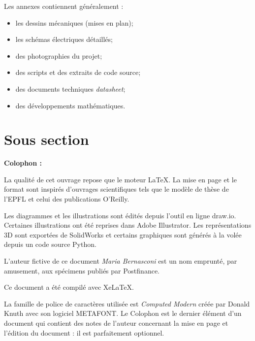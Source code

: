 \documentclass[
    iai, %
    eai, %
]{heig-tb}
\begin{document}
Les annexes contiennent généralement :

\begin{itemize}
  \item les dessins mécaniques (mises en plan);
  \item les schémas électriques détaillés;
  \item des photographies du projet;
  \item des scripts et des extraits de code source;
  \item des documents techniques \pex \emph{datasheet};
  \item des développements mathématiques.
\end{itemize}
\section{Sous section}
\lipsum[1]

\let\cleardoublepage\clearpage
\backmatter

\label{glossaire}
\printnoidxglossary
\printbibliography
\label{index}
\printindex

\clearpage
\Large\textbf{Colophon :}\par\normalsize
\thispagestyle{empty}
La qualité de cet ouvrage repose que le moteur \LaTeX. La mise en page et le format sont inspirés d'ouvrages scientifiques tels que le modèle de thèse de l'EPFL et celui des publications O'Reilly.

Les diagrammes et les illustrations sont édités depuis l'outil en ligne draw.io. Certaines illustrations ont été reprises dans Adobe Illustrator. Les représentations 3D sont exportées de SolidWorks et certains graphiques sont générés à la volée depuis un code source Python.

L'auteur fictive de ce document \emph{Maria Bernasconi} est un nom emprunté, par amusement, aux spécimens publiés par Postfinance.

Ce document a été compilé avec XeLaTeX.

La famille de police de caractères utilisée est \emph{Computed Modern} créée par Donald Knuth avec son logiciel METAFONT.
\vfil
Le Colophon est le dernier élément d'un document qui contient des notes de l'auteur concernant la mise en page et l'édition du document : il est parfaitement optionnel.
\end{document}
